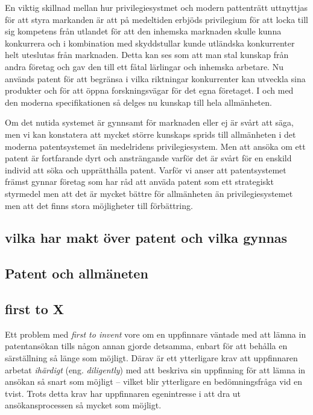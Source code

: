 En viktig skillnad mellan hur privilegiesystmet och modern pattenträtt uttnyttjas för att styra markanden är att på medeltiden erbjöds privilegium för att locka till sig kompetens från utlandet för att den inhemska marknaden skulle kunna konkurrera och i kombination med skyddstullar kunde utländska konkurrenter helt uteslutas från marknaden. Detta kan ses som att man stal kunskap från andra företag och gav den till ett fåtal lärlingar och inhemska arbetare. Nu används patent för att begränsa i vilka riktningar konkurrenter kan utveckla sina produkter och för att öppna forskningsvägar för det egna företaget. I och med den moderna specifikationen så delges nu kunskap till hela allmänheten. 

Om det nutida systemet är gynnsamt för marknaden eller ej är svårt att säga, men vi kan konstatera att mycket större kunskaps sprids till allmänheten i det moderna patentsystemet än medelridens privilegiesystem. Men att ansöka om ett patent är fortfarande dyrt och ansträngande varför det är svårt för en enskild individ att söka och upprätthålla patent. Varför vi anser att patentsystemet främst gynnar företag som har råd att anväda patent som ett strategiskt styrmedel men att det är mycket bättre för allmänheten än privilegiesystemet men att det finns stora möjligheter till förbättring.




\subsection*{vilka har makt över patent och vilka gynnas}


\subsection*{Patent och allmäneten}


\subsection{first to X}


Ett problem med \emph{first to invent} vore om en uppfinnare väntade med att lämna in patentansökan tills någon annan gjorde detsamma, enbart för att behålla en särställning så länge som möjligt. Därav är ett ytterligare krav att uppfinnaren arbetat \emph{ihärdigt} (eng. \emph{diligently}) med att beskriva sin uppfinning för att lämna in ansökan så snart som möjligt\cite{cmu-overview} -- vilket blir ytterligare en bedömningsfråga vid en tvist\cite{cmu-overview}. Trots detta krav har uppfinnaren egenintresse i att dra ut ansökansprocessen så mycket som möjligt.

